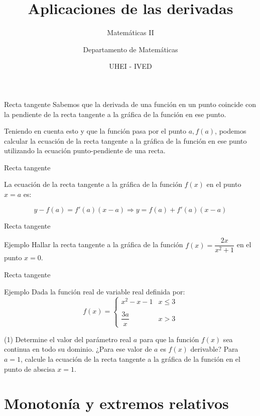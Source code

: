 \documentclass[8pt]{beamer}
\title{Aplicaciones de las derivadas}
\subtitle{Matemáticas II}
\author{Departamento de Matemáticas}
\date[UHEI-IVED]{ UHEI - IVED}
\begin{document}
\titleframe
\begin{frame}
\tableofcontents
\end{frame}

\begin{frame}[t]{Recta tangente}
Sabemos que la derivada de una función en un punto coincide con la pendiente de la recta tangente a la gráfica de la función en ese punto. 

Teniendo en cuenta esto y que la función pasa por el punto $a,f(a)$, podemos calcular la ecuación de la recta tangente a la gráfica de la función en ese punto utilizando la ecuación punto-pendiente de una recta.
\pause
\begin{alertblock}{Recta tangente}

La ecuación de la recta tangente a la gráfica de la función $f(x)$ en el punto $x=a$ es:

\[ y-f(a) = f'(a)(x-a) \Rightarrow y=f(a)+f'(a)(x-a) \]

\end{alertblock}
\end{frame}

\begin{frame}[t]{Recta tangente}
\begin{exampleblock}{Ejemplo}
Hallar la recta tangente a la gráfica de la función $f(x)=\dfrac{2x}{x^2+1}$ en el punto $x=0$.
\end{exampleblock}
\end{frame}

\begin{frame}[t]{Recta tangente}
\begin{exampleblock}{Ejemplo}
Dada la función real de variable real definida por:
\[ f(x)= \begin{cases} x^2-x-1 & x \leq 3 \\ \\ \dfrac{3a}{x} & x>3 \end{cases} \]
\begin{tasks}[label=\alph*)](1)
\task Determine el valor del parámetro real $a$ para que la función $f(x)$ sea continua en todo su dominio. ¿Para ese valor de $a$ es $f(x)$ derivable?
\task Para $a = 1$, calcule la ecuación de la recta tangente a la gráfica de la función en el punto de abscisa $x = 1$.
\end{tasks}

\end{exampleblock}
\end{frame}

\section{Monotonía y extremos relativos}
\end{document}
